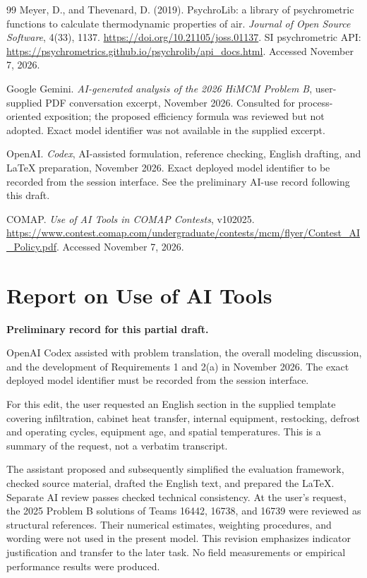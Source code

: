 \documentclass[12pt]{article}
\begin{document}
\begin{thebibliography}{99}
Meyer, D., and Thevenard, D. (2019).
PsychroLib: a library of psychrometric functions to calculate thermodynamic properties of air.
\emph{Journal of Open Source Software}, 4(33), 1137.
\url{https://doi.org/10.21105/joss.01137}.
SI psychrometric API:
\url{https://psychrometrics.github.io/psychrolib/api_docs.html}.
Accessed November 7, 2026.

Google Gemini. \emph{AI-generated analysis of the 2026 HiMCM Problem B},
user-supplied PDF conversation excerpt, November 2026.
Consulted for process-oriented exposition; the proposed efficiency formula was
reviewed but not adopted. Exact model identifier was not available in the supplied excerpt.

OpenAI. \emph{Codex}, AI-assisted formulation, reference checking,
English drafting, and LaTeX preparation, November 2026.
Exact deployed model identifier to be recorded from the session interface.
See the preliminary AI-use record following this draft.

COMAP. \emph{Use of AI Tools in COMAP Contests}, v102025.
\url{https://www.contest.comap.com/undergraduate/contests/mcm/flyer/Contest_AI_Policy.pdf}.
Accessed November 7, 2026.
\end{thebibliography}

\clearpage
{}
{}
\section*{Report on Use of AI Tools}
\noindent\textbf{Preliminary record for this partial draft.}

OpenAI Codex assisted with problem translation, the overall modeling discussion,
and the development of Requirements 1 and 2(a) in November 2026. The exact deployed model
identifier must be recorded from the session interface.

For this edit, the user requested an English section in the supplied template
covering infiltration, cabinet heat transfer, internal equipment, restocking,
defrost and operating cycles, equipment age, and spatial temperatures. This is
a summary of the request, not a verbatim transcript.

The assistant proposed and subsequently simplified the evaluation framework,
checked source material, drafted the English text, and prepared the LaTeX.
Separate AI review passes checked technical consistency. At the user's request,
the 2025 Problem B solutions of Teams 16442, 16738, and 16739 were reviewed as
structural references. Their numerical estimates, weighting procedures, and
wording were not used in the present model. This revision emphasizes indicator
justification and transfer to the later task. No field measurements or empirical
performance results were produced.
\end{document}
